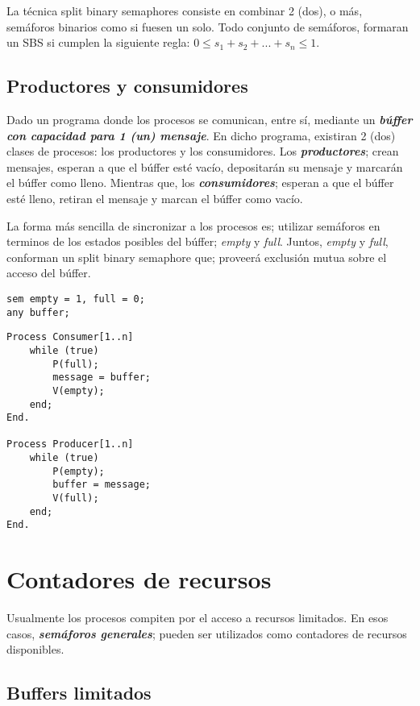 \documentclass[a4paper, 10pt]{report}
\begin{document}
La técnica split binary semaphores consiste en combinar 2 (dos), o más, semáforos binarios como si fuesen un solo. Todo conjunto de semáforos, formaran un SBS si cumplen la siguiente regla: $0 \leq s_{1} + s_{2} + ... + s_{n} \leq 1$.

\subsection{Productores y consumidores}

Dado un programa donde los procesos se comunican, entre sí, mediante un \textbf{\emph{búffer con capacidad para 1 (un) mensaje}}. En dicho programa, existiran 2 (dos) clases de procesos: los productores y los consumidores. Los \textbf{\emph{productores}}; crean mensajes, esperan a que el búffer esté vacío, depositarán su mensaje y marcarán el búffer como lleno. Mientras que, los \textbf{\emph{consumidores}}; esperan a que el búffer esté lleno, retiran el mensaje y marcan el búffer como vacío.

La forma más sencilla de sincronizar a los procesos es; utilizar semáforos en terminos de los estados posibles del búffer; \emph{empty} y \emph{full}. Juntos, \emph{empty} y \emph{full}, conforman un split binary semaphore que; proveerá exclusión mutua sobre el acceso del búffer.

\begin{lstlisting}
sem empty = 1, full = 0;
any buffer;
\end{lstlisting}
\begin{lstlisting}[multicols=2, firstnumber=3]
Process Consumer[1..n]
	while (true)
		P(full);
		message = buffer;
		V(empty);
	end;
End.

Process Producer[1..n]
	while (true)
		P(empty);
		buffer = message;
		V(full);
	end;
End.
\end{lstlisting}

\section{Contadores de recursos}

Usualmente los procesos compiten por el acceso a recursos limitados. En esos casos, \textbf{\emph{semáforos generales}}; pueden ser utilizados como contadores de recursos disponibles.

\subsection{Buffers limitados}
\end{document}
